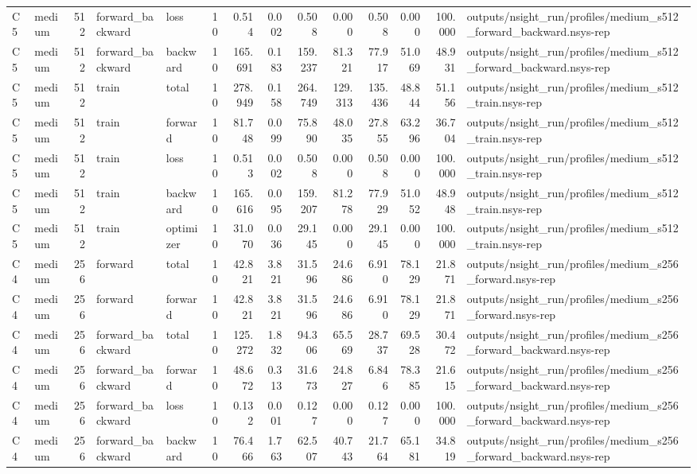 \begin{tabular}{llrllrrrrrrrrl}
C5 & medium & 512 & forward\_backward & loss & 10 & 0.514 & 0.002 & 0.508 & 0.000 & 0.508 & 0.000 & 100.000 & outputs/nsight\_run/profiles/medium\_s512\_forward\_backward.nsys-rep \\
C5 & medium & 512 & forward\_backward & backward & 10 & 165.691 & 0.183 & 159.237 & 81.321 & 77.917 & 51.069 & 48.931 & outputs/nsight\_run/profiles/medium\_s512\_forward\_backward.nsys-rep \\
C5 & medium & 512 & train & total & 10 & 278.949 & 0.158 & 264.749 & 129.313 & 135.436 & 48.844 & 51.156 & outputs/nsight\_run/profiles/medium\_s512\_train.nsys-rep \\
C5 & medium & 512 & train & forward & 10 & 81.748 & 0.099 & 75.890 & 48.035 & 27.855 & 63.296 & 36.704 & outputs/nsight\_run/profiles/medium\_s512\_train.nsys-rep \\
C5 & medium & 512 & train & loss & 10 & 0.513 & 0.002 & 0.508 & 0.000 & 0.508 & 0.000 & 100.000 & outputs/nsight\_run/profiles/medium\_s512\_train.nsys-rep \\
C5 & medium & 512 & train & backward & 10 & 165.616 & 0.095 & 159.207 & 81.278 & 77.929 & 51.052 & 48.948 & outputs/nsight\_run/profiles/medium\_s512\_train.nsys-rep \\
C5 & medium & 512 & train & optimizer & 10 & 31.070 & 0.036 & 29.145 & 0.000 & 29.145 & 0.000 & 100.000 & outputs/nsight\_run/profiles/medium\_s512\_train.nsys-rep \\
C4 & medium & 256 & forward & total & 10 & 42.821 & 3.821 & 31.596 & 24.686 & 6.910 & 78.129 & 21.871 & outputs/nsight\_run/profiles/medium\_s256\_forward.nsys-rep \\
C4 & medium & 256 & forward & forward & 10 & 42.821 & 3.821 & 31.596 & 24.686 & 6.910 & 78.129 & 21.871 & outputs/nsight\_run/profiles/medium\_s256\_forward.nsys-rep \\
C4 & medium & 256 & forward\_backward & total & 10 & 125.272 & 1.832 & 94.306 & 65.569 & 28.737 & 69.528 & 30.472 & outputs/nsight\_run/profiles/medium\_s256\_forward\_backward.nsys-rep \\
C4 & medium & 256 & forward\_backward & forward & 10 & 48.672 & 0.313 & 31.673 & 24.827 & 6.846 & 78.385 & 21.615 & outputs/nsight\_run/profiles/medium\_s256\_forward\_backward.nsys-rep \\
C4 & medium & 256 & forward\_backward & loss & 10 & 0.132 & 0.001 & 0.127 & 0.000 & 0.127 & 0.000 & 100.000 & outputs/nsight\_run/profiles/medium\_s256\_forward\_backward.nsys-rep \\
C4 & medium & 256 & forward\_backward & backward & 10 & 76.466 & 1.763 & 62.507 & 40.743 & 21.764 & 65.181 & 34.819 & outputs/nsight\_run/profiles/medium\_s256\_forward\_backward.nsys-rep \\

\end{tabular}
